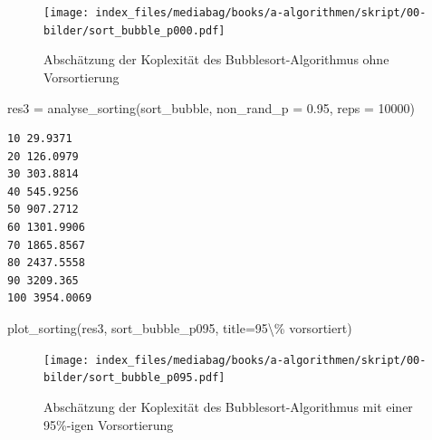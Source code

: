 \documentclass[
  letterpaper,
  DIV=11,
  numbers=noendperiod]{scrreprt}
\newenvironment{Shaded}{\begin{snugshade}}{\end{snugshade}}
\newcommand{\DecValTok}[1]{\textcolor[rgb]{0.68,0.00,0.00}{#1}}
\newcommand{\FloatTok}[1]{\textcolor[rgb]{0.68,0.00,0.00}{#1}}
\newcommand{\NormalTok}[1]{\textcolor[rgb]{0.00,0.23,0.31}{#1}}
\newcommand{\OperatorTok}[1]{\textcolor[rgb]{0.37,0.37,0.37}{#1}}
\newcommand{\StringTok}[1]{\textcolor[rgb]{0.13,0.47,0.30}{#1}}
\begin{document}
\begin{figure}[H]

{\centering \texttt{[image: index\_files/mediabag/books/a-algorithmen/skript/00-bilder/sort\_bubble\_p000.pdf]}

}

\caption{Abschätzung der Koplexität des Bubblesort-Algorithmus ohne
Vorsortierung}

\end{figure}%

\begin{Shaded}
\begin{Highlighting}[]
\NormalTok{res3 }\OperatorTok{=}\NormalTok{ analyse\_sorting(sort\_bubble, non\_rand\_p }\OperatorTok{=} \FloatTok{0.95}\NormalTok{, reps }\OperatorTok{=} \DecValTok{10000}\NormalTok{)}
\end{Highlighting}
\end{Shaded}

\begin{verbatim}
10 29.9371
20 126.0979
30 303.8814
40 545.9256
50 907.2712
60 1301.9906
70 1865.8567
80 2437.5558
90 3209.365
100 3954.0069
\end{verbatim}

\begin{Shaded}
\begin{Highlighting}[]
\NormalTok{plot\_sorting(res3, }\StringTok{\textquotesingle{}sort\_bubble\_p095\textquotesingle{}}\NormalTok{, title}\OperatorTok{=}\StringTok{\textquotesingle{}95\textbackslash{}\% vorsortiert\textquotesingle{}}\NormalTok{)}
\end{Highlighting}
\end{Shaded}

\begin{figure}[H]

{\centering \texttt{[image: index\_files/mediabag/books/a-algorithmen/skript/00-bilder/sort\_bubble\_p095.pdf]}

}

\caption{Abschätzung der Koplexität des Bubblesort-Algorithmus mit einer
95\%-igen Vorsortierung}

\end{figure}%
\end{document}
